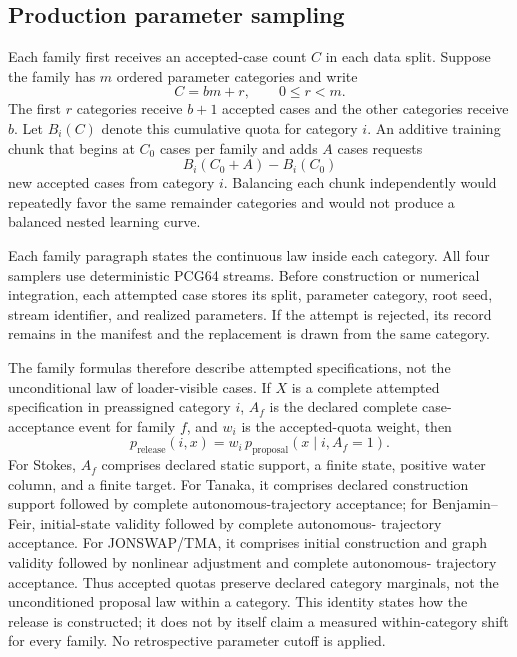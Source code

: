 \documentclass[11pt]{article}
\begin{document}
\subsection{Production parameter sampling}

Each family first receives an accepted-case count $C$ in each data split.
Suppose the family has $m$ ordered parameter categories and write
\begin{equation}
  C=bm+r,\qquad 0\leq r<m.
\end{equation}
The first $r$ categories receive $b+1$ accepted cases and the other
categories receive $b$.  Let $B_i(C)$ denote this cumulative quota for
category $i$.  An additive
training chunk that begins at $C_0$ cases per family and adds $A$ cases
requests
\begin{equation}
  B_i(C_0+A)-B_i(C_0)
  \label{eq:additive-cell-quota}
\end{equation}
new accepted cases from category $i$.  Balancing each chunk independently would
repeatedly favor the same remainder categories and would not produce a balanced
nested learning curve.

Each family paragraph states the continuous law inside each category.  All four
samplers use deterministic PCG64 streams.  Before construction or numerical
integration, each attempted case stores its split, parameter category, root seed, stream
identifier, and realized parameters.  If the attempt is rejected, its record
remains in the manifest and the replacement is drawn from the same category.

The family formulas therefore describe attempted specifications, not the
unconditional law of loader-visible cases.  If \(X\) is a complete attempted
specification in preassigned category \(i\), \(A_f\) is the declared complete
case-acceptance event for family \(f\), and \(w_i\) is the accepted-quota
weight, then
\begin{equation}
  p_{\mathrm{release}}(i,x)
  =w_i\,p_{\mathrm{proposal}}(x\mid i,A_f=1).
  \label{eq:accepted-release-law}
\end{equation}
For Stokes, \(A_f\) comprises declared static support, a finite state, positive
water column, and a finite target.  For Tanaka, it comprises declared
construction support followed by complete autonomous-trajectory acceptance;
for Benjamin--Feir, initial-state validity followed by complete autonomous-
trajectory acceptance.  For JONSWAP/TMA, it comprises initial construction and
graph validity followed by nonlinear adjustment and complete autonomous-
trajectory acceptance.  Thus accepted quotas preserve declared category
marginals, not the unconditioned proposal law within a category.  This
identity states how the release is constructed; it does not by itself claim a
measured within-category shift for every family.  No retrospective parameter
cutoff is applied.
\end{document}
